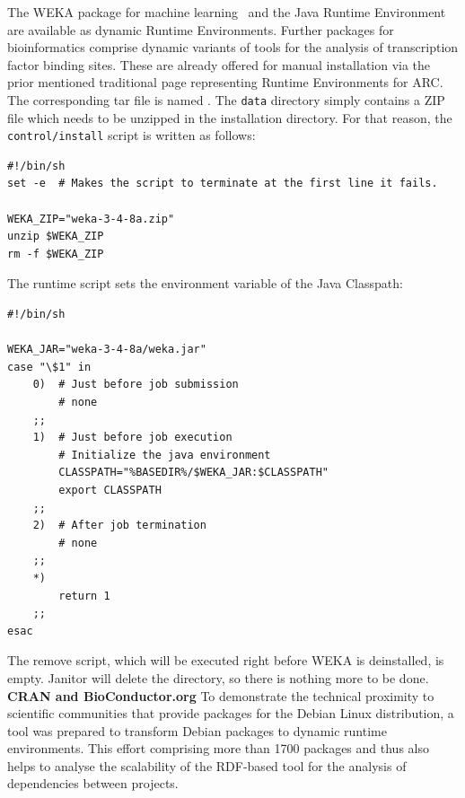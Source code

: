 The WEKA package for machine learning~\cite{FRANK_20074} and the Java Runtime Environment
are available as dynamic Runtime Environments. Further packages for bioinformatics comprise dynamic
variants of tools for the analysis of transcription factor binding sites. These are already offered for manual
installation via the prior mentioned traditional page representing Runtime Environments for ARC. 
The corresponding tar file is named . The \texttt{data} directory simply contains a ZIP file
which needs to be unzipped in the installation directory. For that reason, the \texttt{control/install} script is 
written as follows:
\begin{verbatim} 
#!/bin/sh
set -e  # Makes the script to terminate at the first line it fails.

WEKA_ZIP="weka-3-4-8a.zip"
unzip $WEKA_ZIP
rm -f $WEKA_ZIP
\end{verbatim}
The runtime script sets the environment variable of the Java Classpath:
\begin{verbatim}
#!/bin/sh

WEKA_JAR="weka-3-4-8a/weka.jar"
case "\$1" in
	0)	# Just before job submission
		# none
	;;
	1)	# Just before job execution
		# Initialize the java environment
		CLASSPATH="%BASEDIR%/$WEKA_JAR:$CLASSPATH"
		export CLASSPATH
	;;
	2)	# After job termination
		# none
	;;
	*)
		return 1
	;;
esac	
\end{verbatim}
The remove script, which will be executed right before WEKA is deinstalled, is empty. Janitor will delete the directory, so there
is nothing more to be done.\\



\textbf{CRAN and BioConductor.org} To demonstrate the technical proximity to scientific communities that
provide packages for the Debian Linux distribution, a tool was prepared to transform Debian packages to
dynamic runtime environments\cite{MOELLER_2007}. This effort comprising more than 1700 packages and
thus also helps to analyse the scalability of the RDF-based tool for the analysis of dependencies between
projects.  \\


